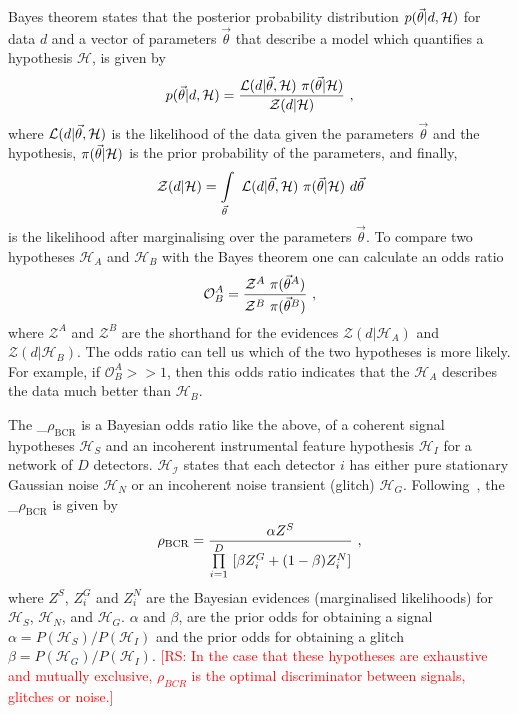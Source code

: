 \documentclass[%
 nofootinbib,
 amsmath,amssymb,
 aps,
 twocolumn
]{revtex4-2}
\newcommand{\mathcmd}[1]{{\sc \relax\ifmmode#1\else $#1$\fi}\xspace}
\newcommand{\bcr}{\mathcmd{\rho_\text{BCR}}}
\newcommand{\parameters}{\mathcmd{\vec{\theta}}}
\newcommand{\rs}[1]{\textcolor{red}{[RS: #1]}}
\begin{document}
Bayes theorem states that the posterior probability distribution $p(\parameters|d,\mathcal{H})$ for data $d$ and a vector of parameters \parameters that describe a model which quantifies a hypothesis $\mathcal{H}$, is given by
\begin{equation}
p(\parameters|d,\mathcal{H}) = \frac{\mathcal{L}(d|\parameters, \mathcal{H}) \ \pi(\parameters | \mathcal{H})}{\mathcal{Z}(d|\mathcal{H})}\ , 
\end{equation}
where $\mathcal{L}(d|\parameters, \mathcal{H})$ is the likelihood of the data given the parameters \parameters and the hypothesis, $\pi(\parameters | \mathcal{H})$ is the prior probability of the parameters, and finally,
\begin{equation}
    \mathcal{Z}(d|\mathcal{H}) = \int\limits_{\parameters} \ \mathcal{L}(d|\parameters,\mathcal{H}) \ \pi(\parameters | \mathcal{H}) \ d\parameters
\end{equation} is the likelihood after marginalising over the parameters \parameters.  To compare two hypotheses $\mathcal{H}_A$ and $\mathcal{H}_B$ with the Bayes theorem one can calculate an odds ratio
\begin{equation}
    \mathcal{O}^A_B = \frac{\mathcal{Z}^A\ \pi(\parameters^A)}{\mathcal{Z}^B\ \pi(\parameters^B)}\ ,
\end{equation}
where $\mathcal{Z}^A$ and $\mathcal{Z}^B$ are the shorthand for the evidences  $\mathcal{Z}(d|\mathcal{H}_A)$ and $\mathcal{Z}(d|\mathcal{H}_B)$. The odds ratio can tell us which of the two hypotheses is more likely. For example, if $\mathcal{O}^A_B >> 1$, then this odds ratio indicates that the $\mathcal{H}_A$ describes the data much better than $\mathcal{H}_B$. 

The \bcr is a Bayesian odds ratio like the above, of a coherent signal hypotheses $\mathcal{H}_S$ and an incoherent instrumental feature hypothesis $\mathcal{H}_I$ for a network of $D$ detectors. $\mathcal{H_I}$ states that each detector $i$ has either pure stationary Gaussian noise $\mathcal{H}_N$ or an incoherent noise transient (glitch) $\mathcal{H}_G$. Following~\citet{BCR1}, the \bcr is given by
\begin{equation}
\label{eq:bcr}
\bcr = \frac{\alpha Z^S}{\prod\limits^D_{i=1} \ [\beta Z^G_i + (1-\beta)Z^N_i]}\ ,
\end{equation}
where $Z^S$, $Z^G_i$ and $Z^N_i$ are the Bayesian evidences (marginalised likelihoods) for $\mathcal{H}_S$, $\mathcal{H}_N$, and $\mathcal{H}_G$. $\alpha$ and $\beta$, are the prior odds for obtaining a signal $\alpha=P(\mathcal{H}_S)/P(\mathcal{H}_I)$ and the prior odds for obtaining a glitch $\beta=P(\mathcal{H}_G)/P(\mathcal{H}_I)$. \rs{In the case that these hypotheses are exhaustive and mutually exclusive, $\rho_{BCR}$ is the optimal discriminator between signals, glitches or noise.}
\end{document}
